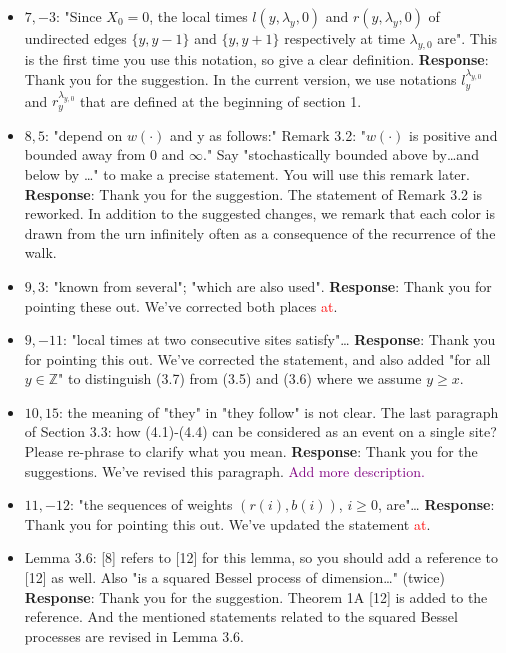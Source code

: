 \documentclass[11pt,a4paper]{article}
\numberwithin{equation}{section}
\newcommand{\edt}[1]{\textcolor{purple}{#1}} %
\def\TBF#1{\textcolor{red}{#1}} %
\begin{document}
\begin{itemize}
		\item 
		$7,-3$: "Since $X_0 = 0$, the local times $l(y, \lambda_y,0)$ and $r(y, \lambda_y,0)$ of undirected edges $\{y, y-1\}$ and $\{y, y+1 \}$ respectively at time $\lambda_{y,0}$ are". This is the first time you use this notation, so give a clear
		definition.
		\subitem \textbf{Response}: Thank you for the suggestion. In the current version, we use notations $l_{y}^{\lambda_{y,0}}$ and $r_{y}^{\lambda_{y,0}}$ that are defined at the beginning of section 1. 
		
		
		\item 
		$8,5$: "depend on $w(\cdot)$ and y as follows:"
		Remark 3.2: "$w(\cdot)$ is positive and bounded away from $0$ and $\infty$." Say "stochastically bounded above by\dots and below by \dots " to make a precise statement. You will use this remark later.
		\subitem \textbf{Response}: Thank you for the suggestion. The statement of Remark 3.2 is reworked. In addition to the suggested changes, we remark that each color is drawn from the urn infinitely often as a consequence of the recurrence of the walk.
		
		
		\item 
		$9,3$: "known from several"; "which are also used".
		\subitem \textbf{Response}:  Thank you for pointing these out. We've corrected both places \TBF{at}. 
		
		\item 
		$9,-11$: "local times at two consecutive sites satisfy"\dots
		\subitem \textbf{Response}: Thank you for pointing this out. We've corrected the statement, and also added "for all $y\in \mathbb{Z}$" to distinguish (3.7) from (3.5) and (3.6) where we assume $y\geq x$.
		
		\item 
		$10,15$: the meaning of "they" in "they follow" is not clear.
		The last paragraph of Section 3.3: how (4.1)-(4.4) can be considered as an event on a single site?
		Please re-phrase to clarify what you mean.
		\subitem \textbf{Response}: Thank you for the suggestions. We've revised this paragraph. \edt{Add more description.}
		
		
		\item 
		$11,-12$: "the sequences of weights $(r(i), b(i))$, $i \geq 0$, are"\dots
		\subitem \textbf{Response}: Thank you for pointing this out.  We've updated the statement \TBF{at}. 
		
		\item 
		Lemma 3.6: [8] refers to [12] for this lemma, so you should add a reference to [12] as well. Also "is a squared Bessel process of dimension\dots " (twice)
		\subitem \textbf{Response}: Thank you for the suggestion. Theorem 1A [12] is added to the reference. And the mentioned statements related to the squared Bessel processes are revised in Lemma 3.6. 
		

\end{itemize}
\end{document}
